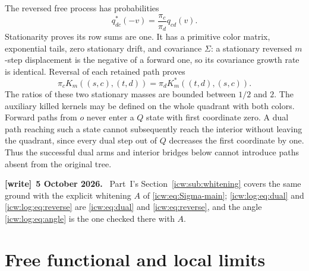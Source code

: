 \documentclass[11pt,letterpaper]{article}
\theoremstyle{remark}\newtheorem{remark}[theorem]{Remark}
\newcommand{\1}{\mathbf1}
\newenvironment{writenote}[1][]{\par\smallskip\begingroup\small
 \noindent\textbf{[write]}\if\relax\detokenize{#1}\relax\else~\textbf{#1.}\fi\ }%
 {\par\endgroup\smallskip}
\begin{document}
The reversed free process has probabilities
\begin{equation}\label{icw:log:eq:dual}
 q^*_{dc}(-v)=\frac{\pi_c}{\pi_d}q_{cd}(v).
\end{equation}
Stationarity proves its row sums are one. It has a primitive color
matrix, exponential tails, zero stationary drift, and covariance
$\Sigma$: a stationary reversed $m$-step displacement is the negative
of a forward one, so its covariance growth rate is identical. Reversal
of each retained path proves
\begin{equation}\label{icw:log:eq:reverse}
 \pi_cK_m((s,c),(t,d))=\pi_dK_m^*((t,d),(s,c)).
\end{equation}
The ratios of these two stationary masses are bounded between $1/2$
and $2$. The auxiliary killed kernels may be defined on the whole
quadrant with both colors. Forward paths from $o$ never enter a $Q$
state with first coordinate zero. A dual path reaching such a state
cannot subsequently reach the interior without leaving the quadrant,
since every dual step out of $Q$ decreases the first coordinate by one.
Thus the successful dual arms and interior bridges below cannot
introduce paths absent from the original tree.
\begin{writenote}[5 October 2026]
Part~I's Section~\ref{icw:sub:whitening} covers the same ground with the explicit whitening $A$ of \eqref{icw:eq:Sigma-main}; \eqref{icw:log:eq:dual} and \eqref{icw:log:eq:reverse} are \eqref{icw:eq:dual} and \eqref{icw:eq:reverse}, and the angle \eqref{icw:log:eq:angle} is the one checked there with $A$.
\end{writenote}

\section{Free functional and local limits}\label{icw:log:sec:free}
\end{document}
